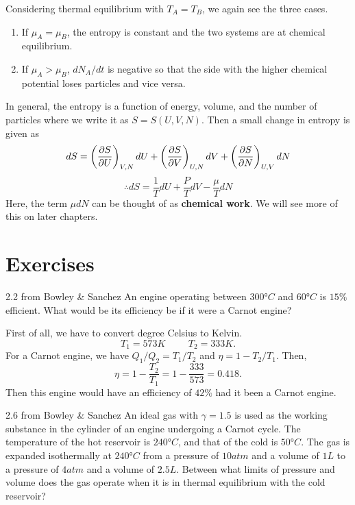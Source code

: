         Considering thermal equilibrium with $T_A=T_B$, we again see the three cases. 
        \begin{enumerate}
            \item If $\mu_A = \mu_B$, the entropy is constant and the two systems are at chemical equilibrium. 
            \item If $\mu_A > \mu_B$, $dN_A/dt$ is negative so that the side with the higher chemical potential loses particles and vice versa.
        \end{enumerate}
        In general, the entropy is a function of energy, volume, and the number of particles where we write it as $S=S(U,V,N)$. Then a small change in entropy is given as
        \begin{equation}
            dS = \left( \frac{\partial S}{\partial U} \right)_{V,N} dU + \left( \frac{\partial S}{\partial V} \right)_{U,N}dV + \left( \frac{\partial S}{\partial N} \right)_{U,V}dN 
        \end{equation}
        \begin{equation}
            \therefore dS = \frac{1}{T}dU + \frac{P}{T}dV - \frac{\mu}{T}dN
        \end{equation}
        Here, the term $\mu dN$ can be thought of as \textbf{chemical work}. We will see more of this on later chapters. 
\newpage    
    \section{Exercises}
    \begin{eocproblem*}{2.2 from Bowley \& Sanchez}
        An engine operating between \(300\si{\degree C}\) and \(60\si{\degree C}\) is \(15\%\) efficient. What would be its efficiency be if it were a Carnot engine?
    \end{eocproblem*}
        First of all, we have to convert degree Celsius to Kelvin. \[T_1 = 573\si{K} \hspace{1cm}T_2=333\si{K}.\] For a Carnot engine, we have \(Q_1/Q_2 = T_1/T_2\) and \(\eta = 1-T_2/T_1\). Then,
        \begin{equation}
            \eta = 1-\frac{T_2}{T_1} = 1 -\frac{333}{573} = 0.418.
        \end{equation}
        Then this engine would have an efficiency of \(42\%\) had it been a Carnot engine.
        
    \begin{eocproblem*}{2.6 from Bowley \& Sanchez}
        An ideal gas with \(\gamma=1.5\) is used as the working substance in the cylinder of an engine undergoing a Carnot cycle. The temperature of the hot reservoir is \(240\si{\degree C}\), and that of the cold is \(50\si{\degree C}\). The gas is expanded isothermally at $240\si{\degree C}$ from a pressure of $10\si{atm}$ and a volume of $1\si{L}$ to a pressure of $4\si{atm}$ and a volume of $2.5\si{L}$. Between what limits of pressure and volume does the gas operate when it is in thermal equilibrium with the cold reservoir?    
    \end{eocproblem*}
    
